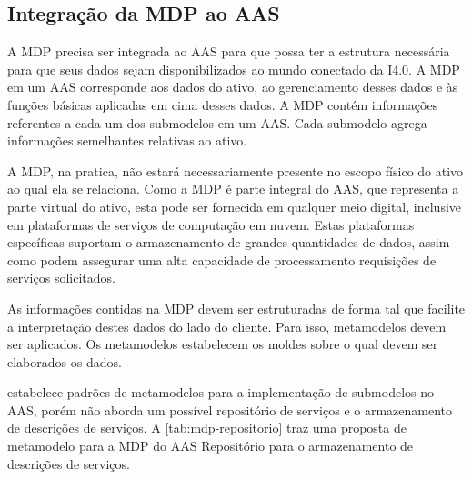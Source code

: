\subsection{Integração da MDP ao AAS}

	A MDP precisa ser integrada ao AAS para que possa ter a estrutura necessária para que seus dados sejam disponibilizados ao mundo conectado da I4.0. A MDP em um AAS corresponde aos dados do ativo, ao gerenciamento desses dados e às funções básicas aplicadas em cima desses dados. A MDP contém informações referentes a cada um dos submodelos em um AAS. Cada submodelo agrega informações semelhantes relativas ao ativo. 
	
	A MDP, na pratica, não estará necessariamente presente no escopo físico do ativo ao qual ela se relaciona. Como a MDP é parte integral do AAS, que representa a parte virtual do ativo, esta pode ser fornecida em qualquer meio digital, inclusive em plataformas de serviços de computação em nuvem. Estas plataformas específicas suportam o armazenamento de grandes quantidades de dados, assim como podem assegurar uma alta capacidade de processamento requisições de serviços solicitados.
	
	As informações contidas na MDP devem ser estruturadas de forma tal que facilite a interpretação destes dados do lado do cliente. Para isso, metamodelos devem ser aplicados. Os metamodelos estabelecem os moldes sobre o qual devem ser elaborados os dados.
	
	 estabelece padrões de metamodelos para a implementação de submodelos no AAS, porém não aborda um possível repositório de serviços e o armazenamento de descrições de serviços. A \autoref{tab:mdp-repositorio} traz uma proposta de metamodelo para a MDP do AAS Repositório para o armazenamento de descrições de serviços.
	
